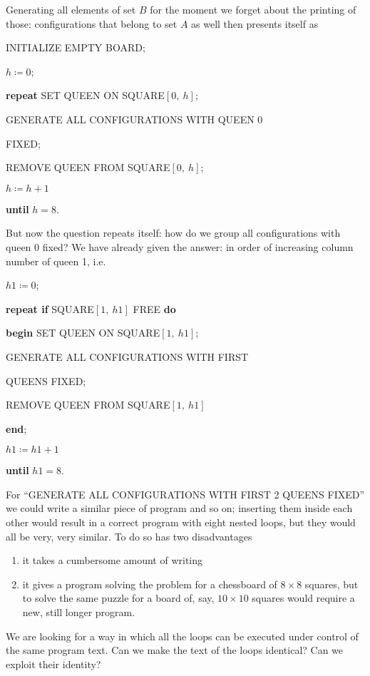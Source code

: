 Generating all elements of set $B$ \textemdash{}  for the moment we forget about the printing of those: configurations that belong to set $A$ as well \textemdash{}  then presents itself as

INITIALIZE EMPTY BOARD;

$h \coloneq 0$;

\textbf{repeat} SET QUEEN ON SQUARE$[0,\ h]$;

\quad GENERATE ALL CONFIGURATIONS WITH QUEEN 0

\quad\quad FIXED;

\quad REMOVE QUEEN FROM SQUARE$[0,\ h]$;

\quad $h \coloneq h + 1$

\textbf{until} $h = 8$.

But now the question repeats itself: how do we group all configurations with queen 0 fixed? We have already given the answer: in order of increasing column number of queen 1, i.e.

$h1 \coloneq 0$;

\textbf{repeat if} SQUARE$[1,\ h1]$ FREE \textbf{do}

\quad \textbf{begin} SET QUEEN ON SQUARE$[1,\ h1]$;

\quad \quad GENERATE ALL CONFIGURATIONS WITH FIRST

\quad \quad {} QUEENS FIXED;

\quad \quad REMOVE QUEEN FROM SQUARE$[1,\ h1]$

\quad \textbf{end};

\quad $h1 \coloneq h1 + 1$

\textbf{until} $h1 = 8$.

For ``GENERATE ALL CONFIGURATIONS WITH FIRST 2 QUEENS FIXED'' we could write a similar piece of program and so on; inserting
them inside each other would result in a correct program with eight nested loops, but they would all be very, very similar. To do so has two disadvantages

\begin{enumerate}[wide, nosep, label=(\arabic*)]
	\item it takes a cumbersome amount of writing
	\item it gives a program solving the problem for a chessboard of $8\times 8$ squares, but to solve the same puzzle for a board of, say, $10\times 10$ squares would require a new, still longer program.
\end{enumerate}

We are looking for a way in which all the loops can be executed under control of the same program text. Can we make the text of the loops identical? Can we exploit their identity?

